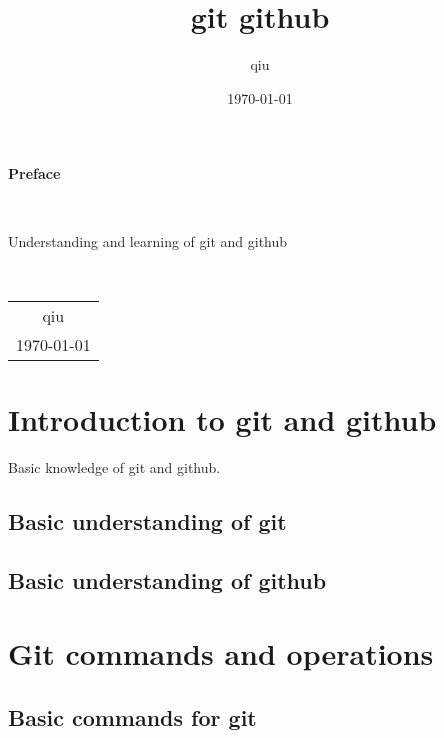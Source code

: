 \documentclass[UTF8,12pt, a4paper, oneside]{ctexbook}
\title{{\Huge{\textbf{git github}}}}
\author{qiu}
\date{\today}
\begin{document}
\maketitle


\setcounter{page}{1}
\begin{center}
    \Huge\textbf{Preface}
\end{center}~\

Understanding and learning of git and github

~\\

\begin{flushright}
    \begin{tabular}{c}
        qiu\\
        \today
    \end{tabular}
\end{flushright}


\newpage
{}
\setcounter{page}{1}
\tableofcontents
\newpage
\setcounter{page}{1}



\chapter{Introduction to git and github}

Basic knowledge of git and github.

\section{Basic understanding of git}

\section{Basic understanding of github}


\chapter{Git commands and operations}

\section{Basic commands for git}
\end{document}

